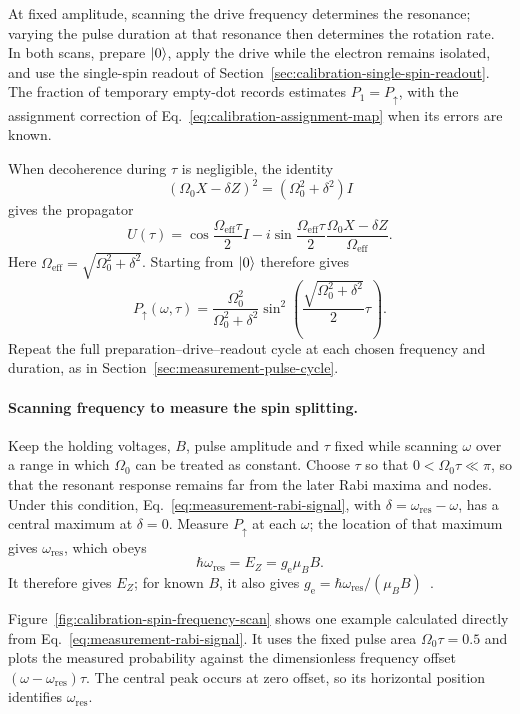 At fixed amplitude, scanning the drive frequency determines the
resonance; varying the pulse duration at that resonance then
determines the rotation rate. In both scans, prepare $\lvert 0\rangle$,
apply the drive while the
electron remains isolated, and use the single-spin readout of
Section~\ref{sec:calibration-single-spin-readout}. The fraction
of temporary empty-dot records estimates $P_1=P_\uparrow$,
with the assignment correction of
Eq.~\eqref{eq:calibration-assignment-map} when its errors are known.

When decoherence during $\tau$ is negligible, the identity
\[
 (\Omega_0X-\delta Z)^2=(\Omega_0^2+\delta^2)I
\]
gives the propagator
\[
 U(\tau)=\cos\frac{\Omega_{\mathrm{eff}}\tau}{2}I
 -i\sin\frac{\Omega_{\mathrm{eff}}\tau}{2}
       \frac{\Omega_0X-\delta Z}{\Omega_{\mathrm{eff}}}.
\]
Here $\Omega_{\mathrm{eff}}=\sqrt{\Omega_0^2+\delta^2}$.
Starting from $\lvert 0\rangle$ therefore gives
\begin{equation}
 P_\uparrow(\omega,\tau)
 =\frac{\Omega_0^2}{\Omega_0^2+\delta^2}
       \sin^2\!\left(\frac{\sqrt{\Omega_0^2+\delta^2}}{2}\tau\right).
 \label{eq:measurement-rabi-signal}
\end{equation}
Repeat the full preparation--drive--readout cycle at each chosen
frequency and duration, as in
Section~\ref{sec:measurement-pulse-cycle}.

\paragraph{Scanning frequency to measure the spin splitting.}
Keep the holding voltages, $B$, pulse amplitude and $\tau$ fixed
while scanning $\omega$ over a range in which $\Omega_0$ can be treated
as constant. Choose $\tau$ so that
$0<\Omega_0\tau\ll\pi$, so that the resonant response remains far
from the later Rabi maxima and nodes. Under this condition,
Eq.~\eqref{eq:measurement-rabi-signal}, with
$\delta=\omega_{\mathrm{res}}-\omega$, has a central maximum at
$\delta=0$. Measure $P_\uparrow$ at each $\omega$; the location of
that maximum gives $\omega_{\mathrm{res}}$, which obeys
\begin{equation}
 \hbar\omega_{\mathrm{res}}=E_Z=g_{\mathrm e}\mu_BB.
 \label{eq:measurement-spin-resonance-energy}
\end{equation}
It therefore gives $E_Z$; for known $B$, it also gives
$g_{\mathrm e}=\hbar\omega_{\mathrm{res}}/(\mu_BB)$~\cite{Kawakami2014}.

Figure~\ref{fig:calibration-spin-frequency-scan} shows one example
calculated directly from Eq.~\eqref{eq:measurement-rabi-signal}.
It uses the fixed pulse area $\Omega_0\tau=0.5$ and plots the
measured probability against the dimensionless frequency offset
$(\omega-\omega_{\mathrm{res}})\tau$. The central peak occurs at
zero offset, so its horizontal position identifies
$\omega_{\mathrm{res}}$.

